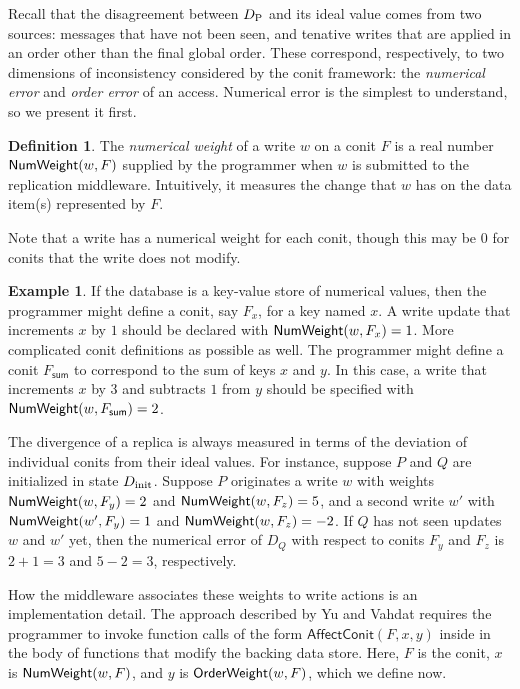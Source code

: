 \documentclass[]             %
{NASA}                       %
\theoremstyle{definition}
\newtheorem{example}[theorem]{Example}
\newtheorem{definition}[theorem]{Definition}
\begin{document}
Recall that the disagreement between $D_{\textrm{P}}$ and its ideal value
comes from two sources: messages that have not been seen, and tenative
writes that are applied in an order other than the final global
order. These correspond, respectively, to two dimensions of
inconsistency considered by the conit framework: the \emph{numerical
  error} and \emph{order error} of an access. Numerical error is the
simplest to understand, so we present it first.

\begin{definition}
  The \emph{numerical weight} of a write $w$ on a conit $F$ is a real
  number $\mathsf{NumWeight}(w, F)$ supplied by the programmer when $w$ is
  submitted to the replication middleware. Intuitively, it measures
  the change that $w$ has on the data item(s) represented by $F$.
\end{definition}

Note that a write has a numerical weight for each conit, though this
may be $0$ for conits that the write does not modify.

\begin{example}
  If the database is a key-value store of numerical values, then the
  programmer might define a conit, say $F_x$, for a key named $x$. A
  write update that increments $x$ by $1$ should be declared with
  $\mathsf{NumWeight}(w, F_x) = 1$. More complicated conit definitions as
  possible as well. The programmer might define a conit
  $F_{\mathsf{sum}}$ to correspond to the sum of keys $x$ and $y$. In
  this case, a write that increments $x$ by 3 and subtracts $1$ from
  $y$ should be specified with $\mathsf{NumWeight}(w, F_{\mathsf{sum}}) = 2$.
\end{example}

The divergence of a replica is always measured in terms of the
deviation of individual conits from their ideal values. For instance,
suppose $P$ and $Q$ are initialized in state $D_\textrm{init}$. Suppose $P$
originates a write $w$ with weights $\mathsf{NumWeight}(w, F_y) = 2$ and
$\mathsf{NumWeight}(w, F_z) = 5$, and a second write $w'$ with
$\mathsf{NumWeight}(w', F_y) = 1$ and $\mathsf{NumWeight}(w, F_z) = -2$. If $Q$ has
not seen updates $w$ and $w'$ yet, then the numerical error of $D_Q$
with respect to conits $F_y$ and $F_z$ is $2 + 1 = 3$ and $5 - 2 = 3$,
respectively.

How the middleware associates these weights to write actions is an
implementation detail. The approach described by Yu and Vahdat \cite{2002tact}
requires the programmer to invoke function calls of the form
$\mathsf{AffectConit}(F, x, y)$ inside in the body of functions that
modify the backing data store. Here, $F$ is the conit, $x$ is
$\mathsf{NumWeight}(w, F)$, and $y$ is $\mathsf{OrderWeight}(w, F)$, which we define
now.
\end{document}
